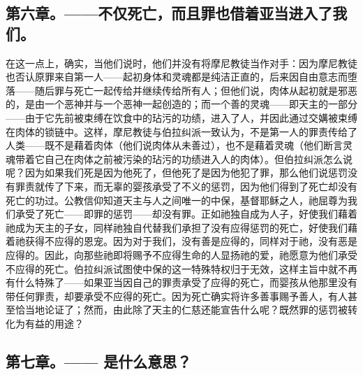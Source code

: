 
\subsection{第六章。——不仅死亡，而且罪也借着亚当进入了我们。}

在这一点上，确实，当他们说时，他们并没有将摩尼教徒当作对手：因为摩尼教徒也否认原罪来自第一人——起初身体和灵魂都是纯洁正直的，后来因自由意志而堕落——随后罪与死亡一起传给并继续传给所有人；但他们说，肉体从起初就是邪恶的，是由一个恶神并与一个恶神一起创造的；而一个善的灵魂——即天主的一部分——由于它先前被束缚在饮食中的玷污的功绩，进入了人，并因此通过交媾被束缚在肉体的锁链中。这样，摩尼教徒与伯拉纠派一致认为，不是第一人的罪责传给了人类——既不是藉着肉体（他们说肉体从未善过），也不是藉着灵魂（他们断言灵魂带着它自己在肉体之前被污染的玷污的功绩进入人的肉体）。但伯拉纠派怎么说呢？因为如果我们死是因为他死了，但他死了是因为他犯了罪，那么他们说惩罚没有罪责就传了下来，而无辜的婴孩承受了不义的惩罚，因为他们得到了死亡却没有死亡的功过。公教信仰知道天主与人之间唯一的中保，基督耶稣之人，祂屈尊为我们承受了死亡——即罪的惩罚——却没有罪。正如祂独自成为人子，好使我们藉着祂成为天主的子女，同样祂独自代替我们承担了没有应得惩罚的死亡，好使我们藉着祂获得不应得的恩宠。因为对于我们，没有善是应得的，同样对于祂，没有恶是应得的。因此，向那些祂即将赐予不应得生命的人显扬祂的爱，祂愿意为他们承受不应得的死亡。伯拉纠派试图使中保的这一特殊特权归于无效，这样主旨中就不再有什么特殊了——如果亚当因自己的罪责承受了应得的死亡，而婴孩从他那里没有带任何罪责，却要承受不应得的死亡。因为死亡确实将许多善事赐予善人，有人甚至恰当地论证了；然而，由此除了天主的仁慈还能宣告什么呢？既然罪的惩罚被转化为有益的用途？\par


\subsection{第七章。—— 是什么意思？}

